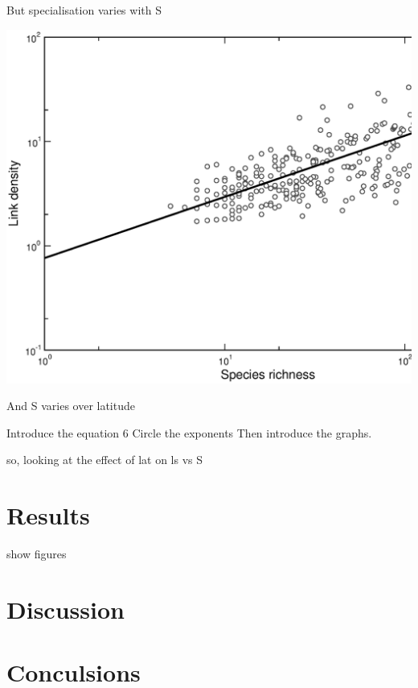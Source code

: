 \documentclass{beamer}
\begin{document}
\begin{frame}{But specialisation varies with S}
    \begin{center}
      \includegraphics[width=.8\textwidth]{Figures/results/LS_vs_S_fitline_observed.eps}

    And S varies over latitude
    \end{center}
  \end{frame}
  
 Introduce the equation
6 Circle the exponents
 Then introduce the graphs.  

  so, looking at the effect of lat on ls vs S

\section*{Results}

  show figures

\section*{Discussion}

  

\section*{Conculsions}
\end{document}
